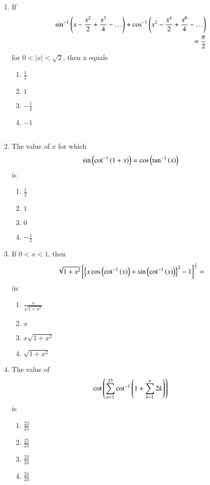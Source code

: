 \documentclass[journal,12pt,twocolumn,article]{IEEEtran}
\theoremstyle{remark}
\begin{document}
\begin{enumerate}
\item If 
\begin{align*}
\sin ^{-1}\left(x-\frac{x^2}{2}+\frac{x^3}{4}-\ldots\right)+ \cos ^{-1}\left(x^2-\frac{x^4}{2}+\frac{x^6}{4}-\ldots\right)\\=\frac{\pi}{2}
\end{align*}
for $0<|x|<\sqrt{2}$, then x equals 
\hfill {}
\begin{multicols}{2}
\begin{enumerate}
\item $\frac{1}{2}$
\item $1$ 
\columnbreak
\item $-\frac{1}{2}$ 
\item $-1$\\\\
\end{enumerate}
\end{multicols}
\item The value of $x$ for which 
\begin{align*}
\sin\left(\cot^{-1}\left(1+x\right)\right)=\cos \left(\tan ^{-1}\left(x\right)\right)
\end{align*}
is 
\hfill {}
\begin{multicols}{2}
\begin{enumerate}
\item $\frac{1}{2}$ 
\item $1$
\columnbreak
\item $0$ 
\item $-\frac{1}{2}$
\end{enumerate}
\end{multicols}
\item  If $0<x<1$, then 
\begin{align*}
\sqrt{1+x^2}{}\left[\left\{ x\cos \left(\cot ^{-1}\left(x\right)\right)+ \sin \left(\cot ^{-1}\left(x\right)\right)\right\}^2 -1\right]^{\frac{1}{2}}=
\end{align*}
iis
\hfill {}
\begin{multicols}{2}
\begin{enumerate}
\item $\frac{x}{\sqrt{1+x^2}}$ 
\item $x$
\columnbreak
\item $x\sqrt{1+x^2}$ 
\item $\sqrt{1+x^2}$
\end{enumerate}
\end{multicols}
\item The value of 
\begin{align*}
\cot \left(\sum_{n=1}^{23} \cot ^{-1}\left(1+\sum_{k=1}^{n} 2k\right)\right)
\end{align*}
is
\hfill {}
\begin{multicols}{2}
\begin{enumerate}
\item $\frac{23}{25}$ 
\item $\frac{25}{23}$ 
\columnbreak
\item $\frac{23}{24}$ 
\item $\frac{24}{23}$
\end{enumerate}
\end{multicols}
\end{enumerate}
\end{document}
